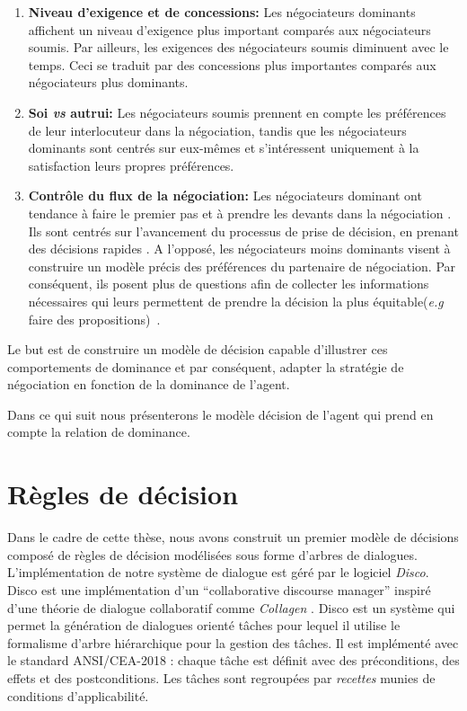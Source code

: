 	\begin{enumerate}
		\item \textbf{Niveau d'exigence et de concessions:} Les négociateurs dominants affichent un niveau d'exigence plus important comparés aux négociateurs soumis. Par ailleurs, les exigences des négociateurs soumis diminuent avec le temps. Ceci se traduit par des concessions plus importantes comparés aux négociateurs plus dominants. \cite{de1995impact}
		
		\item \textbf{Soi \emph{vs} autrui:} Les négociateurs soumis prennent en compte les préférences de leur interlocuteur dans la négociation, tandis que les négociateurs  dominants sont centrés sur eux-mêmes et s'intéressent uniquement à la satisfaction leurs propres préférences. \cite{fiske1993controlling,de1995impact}
		
		\item \textbf{Contrôle du flux de la négociation:}
		Les négociateurs dominant ont tendance à faire le premier pas et à prendre les devants dans la négociation \cite {magee2007power}. Ils sont centrés sur l'avancement du processus de prise de décision, en prenant des décisions rapides \cite{zablotskaya2012relating}.
		A l'opposé, les négociateurs moins dominants visent à construire un modèle précis des préférences du partenaire de négociation. 
		Par conséquent,  ils posent plus de questions afin de collecter les informations nécessaires qui leurs permettent de prendre la décision la plus équitable(\emph{e.g}  faire des propositions)~\cite{de2004influence}. 
		
	\end{enumerate}
	
	
	Le but est de construire un modèle de décision capable d'illustrer ces comportements de dominance et par conséquent, adapter la stratégie de négociation en fonction de la dominance de l'agent.
	
	Dans ce qui suit nous présenterons le modèle décision de l'agent qui prend en compte la relation de dominance.
	
	
	\section{Règles de décision}
	Dans le cadre de cette thèse, nous avons construit un premier modèle de décisions composé de règles de décision modélisées sous forme d'arbres de dialogues. L'implémentation de notre système de dialogue est géré par le logiciel \emph{Disco}. Disco est une implémentation d'un ``collaborative discourse manager'' inspiré d'une théorie de dialogue collaboratif comme \emph{Collagen} \cite{rich1997collagen}. Disco est un système qui permet la génération de dialogues orienté tâches pour lequel il utilise le formalisme d'arbre hiérarchique pour la gestion des tâches. Il est implémenté avec le standard ANSI/CEA-2018 : chaque tâche est définit avec des préconditions, des effets et des postconditions. Les tâches sont regroupées par \emph{recettes} munies de conditions d'applicabilité.
	
